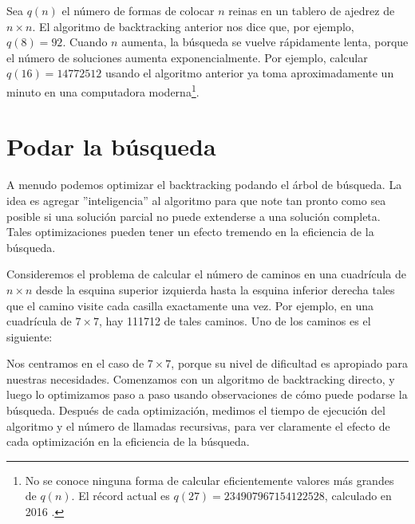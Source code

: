 Sea $q(n)$ el número de formas
de colocar $n$ reinas en un tablero de ajedrez de $n \times n$.
El algoritmo de backtracking anterior
nos dice que, por ejemplo, $q(8)=92$.
Cuando $n$ aumenta, la búsqueda se vuelve rápidamente lenta,
porque el número de soluciones aumenta
exponencialmente.
Por ejemplo, calcular $q(16)=14772512$
usando el algoritmo anterior ya toma aproximadamente un minuto
en una computadora moderna\footnote{No se conoce ninguna forma de
calcular eficientemente valores más grandes de $q(n)$. El récord actual es
$q(27)=234907967154122528$, calculado en 2016 \cite{q27}.}.

\section{Podar la búsqueda}

A menudo podemos optimizar el backtracking
podando el árbol de búsqueda.
La idea es agregar ''inteligencia'' al algoritmo
para que note tan pronto como sea posible
si una solución parcial no puede extenderse
a una solución completa.
Tales optimizaciones pueden tener un efecto
tremendo en la eficiencia de la búsqueda.

Consideremos el problema
de calcular el número de caminos
en una cuadrícula de $n \times n$ desde la esquina superior izquierda
hasta la esquina inferior derecha tales que el
camino visite cada casilla exactamente una vez.
Por ejemplo, en una cuadrícula de $7 \times 7$,
hay 111712 de tales caminos.
Uno de los caminos es el siguiente:

\begin{center}
\end{center}

Nos centramos en el caso de $7 \times 7$,
porque su nivel de dificultad es apropiado para nuestras necesidades.
Comenzamos con un algoritmo de backtracking directo,
y luego lo optimizamos paso a paso usando observaciones
de cómo puede podarse la búsqueda.
Después de cada optimización, medimos el tiempo de ejecución
del algoritmo y el número de llamadas recursivas,
para ver claramente el efecto de cada
optimización en la eficiencia de la búsqueda.

